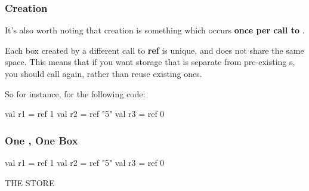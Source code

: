 \documentclass[aspectratio=169]{beamer}
\begin{document}
\begin{frame}[fragile]
  \frametitle{ Creation}

  It's also worth noting that  creation is something which occurs
  \textbf{once per call to }.

  \pause
  \vspace{\fill}

  Each box created by a different call to \textbf{ref} is unique, and does not
  share the same space. This means that if you want storage that is separate
  from pre-existing s, you should call  again, rather than
  reuse existing ones.

  \pause
  \vspace{\fill}

  So for instance, for the following code:

  \begin{codeblock}
    val r1 = ref 1
    val r2 = ref "5"
    val r3 = ref 0
  \end{codeblock}
\end{frame}

\begin{frame}[fragile]
  \frametitle{One , One Box}

  \begin{center}
    \begin{minipage}[t][2.5in][t]{0.55\textwidth}
      \vspace{\fill}
      \begin{codeblock}
        val r1 = ref 1
        val r2 = ref "5"
        val r3 = ref 0
      \end{codeblock}
      \vspace{\fill}
    \end{minipage}
    \hfill\vline\hfill
    \begin{minipage}[t][2.5in][t]{0.35\textwidth}
      \centering
      {\hspace{-20pt}\color{gray} \large THE STORE}

      \vspace{\fill}
      \begin{tikzpicture}
      \end{tikzpicture}
      \vspace{\fill}
    \end{minipage}
  \end{center}
\end{frame}
\end{document}
